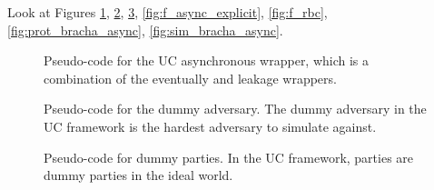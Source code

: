 %


Look at Figures \ref{fig:wrapper_async_new}, \ref{fig:dummy_adversary}, \ref{fig:dummy_party}, \ref{fig:f_async_explicit}, \ref{fig:f_rbc}, \ref{fig:prot_bracha_async}, \ref{fig:sim_bracha_async}.

\begin{figure}[h]
\centering
	
	\caption{Pseudo-code for the UC asynchronous wrapper, which is a combination of the eventually and leakage wrappers.}
	\label{fig:wrapper_async_new}
\end{figure}

\begin{figure}[h]
\centering
	
	\caption{Pseudo-code for the dummy adversary. The dummy adversary in the UC framework is the hardest adversary to simulate against.}
	\label{fig:dummy_adversary}
\end{figure}

\begin{figure}[h]
\centering
	
	\caption{Pseudo-code for dummy parties. In the UC framework, parties are dummy parties in the ideal world.}
	\label{fig:dummy_party}
\end{figure}

